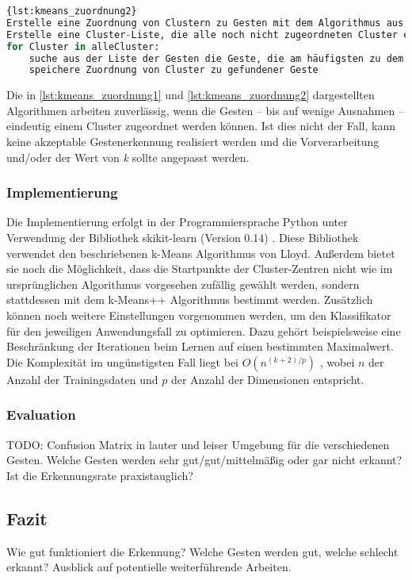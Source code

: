 \begin{lstlisting}[language=Python,caption={Zuordnung von Cluster-Zentrum zu Geste, Variante 2},label={lst:kmeans_zuordnung2}]{lst:kmeans_zuordnung2}
Erstelle eine Zuordnung von Clustern zu Gesten mit dem Algorithmus aus Quelltext 4.1
Erstelle eine Cluster-Liste, die alle noch nicht zugeordneten Cluster enthält
for Cluster in alleCluster:
    suche aus der Liste der Gesten die Geste, die am häufigsten zu dem Cluster zugeordnet wird
    speichere Zuordnung von Cluster zu gefundener Geste
\end{lstlisting}

Die in \autoref{lst:kmeans_zuordnung1} und \autoref{lst:kmeans_zuordnung2} dargestellten Algorithmen arbeiten
zuverlässig, wenn die Gesten -- bis auf wenige Ausnahmen -- eindeutig einem Cluster zugeordnet werden können. Ist dies nicht der Fall, kann keine akzeptable Gestenerkennung realisiert werden und die Vorverarbeitung und/oder der Wert von \emph{k} sollte angepasst werden.

\subsubsection{Implementierung} \label{subsubsec:kMeansImpl}
Die Implementierung erfolgt in der Programmiersprache Python unter Verwendung der Bibliothek skikit-learn (Version 0.14) \cite{sklearn}. Diese Bibliothek verwendet den beschriebenen k-Means Algorithmus von Lloyd. Außerdem bietet sie noch die Möglichkeit, dass die Startpunkte der Cluster-Zentren nicht wie im ursprünglichen Algorithmus vorgesehen zufällig gewählt werden, sondern stattdessen mit dem k-Means++ Algorithmus \cite{kMeans++} bestimmt werden. Zusätzlich können noch weitere 
Einstellungen vorgenommen werden, um den Klassifikator für den jeweiligen Anwendungsfall  zu optimieren. Dazu gehört beispielsweise eine Beschränkung der Iterationen beim Lernen auf einen bestimmten Maximalwert.
Die Komplexität im ungünstigsten Fall liegt bei $O(n^{(k+2)/p})$ \cite{sklearn.kmeans, kMeansHowSlow}, wobei $n$ der Anzahl der Trainingsdaten und $p$ der Anzahl der Dimensionen entspricht.

\subsubsection{Evaluation}
TODO: Confusion Matrix in lauter und leiser Umgebung für die verschiedenen Gesten. Welche Gesten werden sehr gut/gut/mittelmäßig oder gar nicht erkannt? Ist die Erkennungsrate praxistauglich?

\subsection{Fazit}
Wie gut funktioniert die Erkennung? Welche Gesten werden gut, welche schlecht erkannt? Ausblick auf potentielle weiterführende Arbeiten.